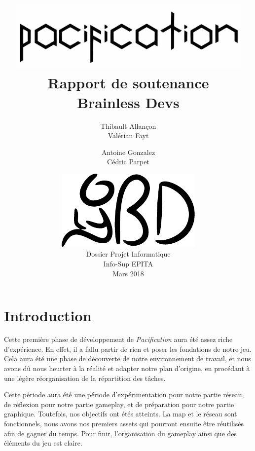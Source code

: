 \documentclass[12pt]{report}
\begin{document}
\title{
	{\vspace{3em}\protect\centering\protect\includegraphics[width=0.9\textwidth]{pacification_vector.pdf}}\\
	{\vspace{4em}\Huge Rapport de soutenance}\\
	{\large Brainless Devs}
}
\author{
	Thibault Allançon\\
	Valérian Fayt
	\and
	Antoine Gonzalez\\
	Cédric Parpet}
\date{
	{\vfill\protect\centering\protect\includegraphics{brainless_devs.pdf}}\\
	Dossier Projet Informatique\\
	Info-Sup EPITA\\
	Mars 2018
}

\maketitle
\tableofcontents

\chapter{Introduction}

Cette première phase de développement de \textit{Pacification} aura été assez riche d'expérience. En effet, il a fallu partir de rien et poser les fondations de notre jeu. Cela aura été une phase de découverte de notre environnement de travail, et nous avons dû nous heurter à la réalité et adapter notre plan d'origine, en procédant à une légère réorganisation de la répartition des tâches.

Cette période aura été une période d'expérimentation pour notre partie réseau, de réflexion pour notre partie gameplay, et de préparation pour notre partie graphique. Toutefois, nos objectifs ont étés atteints. La map et le réseau sont fonctionnels, nous avons nos premiers assets qui pourront ensuite être réutilisés afin de gagner du temps. Pour finir, l'organisation du gameplay ainsi que des éléments du jeu est claire.
\end{document}

